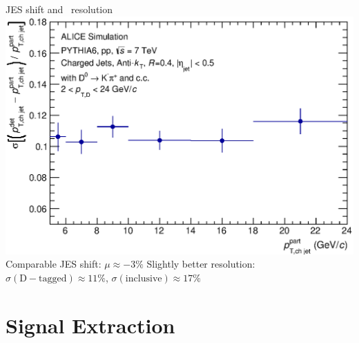 \documentclass{beamer}
\begin{document}
\begin{frame}{JES shift and \pt\ resolution}
\includegraphics[width=.3\paperwidth]{img/HQ16_Simulation_Resolution}
\newline
Comparable JES shift: $\mu\approx -3\%$
\newline
Slightly better resolution: $\sigma(\mathrm{D-tagged})\approx11\%$, $\sigma(\mathrm{inclusive})\approx17\%$
\end{frame}

\section{Signal Extraction}
\end{document}
